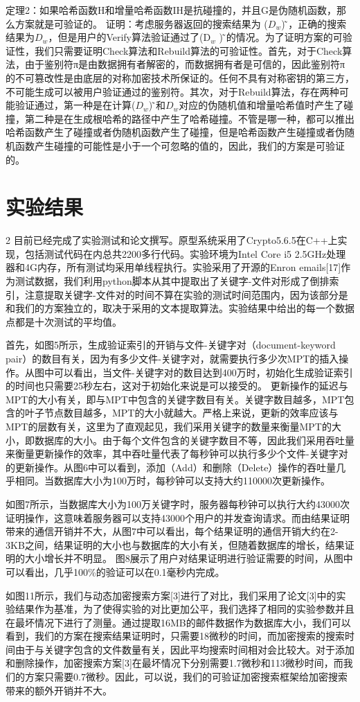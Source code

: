 定理2：如果哈希函数H和增量哈希函数IH是抗碰撞的，并且G是伪随机函数，那么方案就是可验证的。
证明：考虑服务器返回的搜索结果为 ($D_w $) ̃，正确的搜索结果为$D_w$，但是用户的Verify算法验证通过了(D$_w$ ) ̃的情况。为了证明方案的可验证性，我们只需要证明Check算法和Rebuild算法的可验证性。首先，对于Check算法，由于鉴别符π是由数据拥有者解密的，而数据拥有者是可信的，因此鉴别符π的不可篡改性是由底层的对称加密技术所保证的。任何不具有对称密钥的第三方，不可能生成可以被用户验证通过的鉴别符。其次，对于Rebuild算法，存在两种可能验证通过，第一种是在计算($D_w $) ̃和$D_w$对应的伪随机值和增量哈希值时产生了碰撞，第二种是在生成根哈希的路径中产生了哈希碰撞。不管是哪一种，都可以推出哈希函数产生了碰撞或者伪随机函数产生了碰撞，但是哈希函数产生碰撞或者伪随机函数产生碰撞的可能性是小于一个可忽略的值的，因此，我们的方案是可验证的。

\section{实验结果} 2
目前已经完成了实验测试和论文撰写。原型系统采用了Crypto5.6.5在C++上实现，包括测试代码在内总共2200多行代码。实验环境为Intel Core i5 2.5GHz处理器和4G内存，所有测试均采用单线程执行。实验采用了开源的Enron emails[17]作为测试数据，我们利用python脚本从其中提取出了关键字-文件对形成了倒排索引，注意提取关键字-文件对的时间不算在实验的测试时间范围内，因为该部分是和我们的方案独立的，取决于采用的文本提取算法。实验结果中给出的每一个数据点都是十次测试的平均值。

首先，如图5所示，生成验证索引的开销与文件-关键字对（document-keyword pair）的数目有关，因为有多少文件-关键字对，就需要执行多少次MPT的插入操作。从图中可以看出，当文件-关键字对的数目达到400万时，初始化生成验证索引的时间也只需要25秒左右，这对于初始化来说是可以接受的。
更新操作的延迟与MPT的大小有关，即与MPT中包含的关键字数目有关。关键字数目越多，MPT包含的叶子节点数目越多，MPT的大小就越大。严格上来说，更新的效率应该与MPT的层数有关，这里为了直观起见，我们采用关键字的数量来衡量MPT的大小，即数据库的大小。由于每个文件包含的关键字数目不等，因此我们采用吞吐量来衡量更新操作的效率，其中吞吐量代表了每秒钟可以执行多少个文件-关键字对的更新操作。从图6中可以看到，添加（Add）和删除（Delete）操作的吞吐量几乎相同。当数据库大小为100万时，每秒钟可以支持大约110000次更新操作。

如图7所示，当数据库大小为100万关键字时，服务器每秒钟可以执行大约43000次证明操作，这意味着服务器可以支持43000个用户的并发查询请求。而由结果证明带来的通信开销并不大，从图7中可以看出，每个结果证明的通信开销大约在2-3KB之间，结果证明的大小也与数据库的大小有关，但随着数据库的增长，结果证明的大小增长并不明显。
图8展示了用户对结果证明进行验证需要的时间，从图中可以看出，几乎100\%的验证可以在0.1毫秒内完成。


如图11所示，我们与动态加密搜索方案[3]进行了对比，我们采用了论文[3]中的实验结果作为基准，为了使得实验的对比更加公平，我们选择了相同的实验参数并且在最坏情况下进行了测量。通过提取16MB的邮件数据作为数据库大小，我们可以看到，我们的方案在搜索结果证明时，只需要18微秒的时间，而加密搜索的搜索时间由于与关键字包含的文件数量有关，因此平均搜索时间相对会比较大。对于添加和删除操作，加密搜索方案[3]在最坏情况下分别需要1.7微秒和113微秒时间，而我们的方案只需要0.7微秒。因此，可以说，我们的可验证加密搜索框架给加密搜索带来的额外开销并不大。
